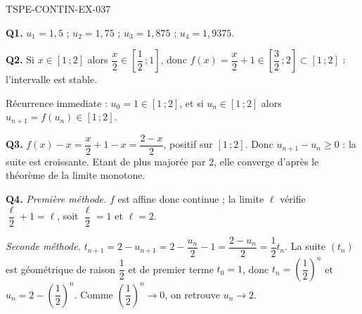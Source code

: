 \begin{corrige}{TSPE-CONTIN-EX-037}

\textbf{Q1.} $u_1 = 1{,}5$ ; $u_2 = 1{,}75$ ; $u_3 = 1{,}875$ ; $u_4 = 1{,}9375$.

\textbf{Q2.} Si $x \in [1\,;2]$ alors $\dfrac{x}{2} \in \left[\dfrac12\,;1\right]$, donc $f(x) = \dfrac{x}{2} + 1 \in \left[\dfrac32\,;2\right] \subset [1\,;2]$ : l'intervalle est stable.

Récurrence immediate : $u_0 = 1 \in [1\,;2]$, et si $u_n \in [1\,;2]$ alors $u_{n+1} = f(u_n) \in [1\,;2]$.

\textbf{Q3.} $f(x) - x = \dfrac{x}{2} + 1 - x = \dfrac{2-x}{2}$, positif sur $[1\,;2]$. Donc $u_{n+1} - u_n \geq 0$ : la suite est croissante. Etant de plus majorée par $2$, elle converge d'après le théorème de la limite monotone.

\textbf{Q4.} \emph{Première méthode.} $f$ est affine donc continue ; la limite $\ell$ vérifie $\dfrac{\ell}{2} + 1 = \ell$, soit $\dfrac{\ell}{2} = 1$ et $\ell = 2$.

\emph{Seconde méthode.} $t_{n+1} = 2 - u_{n+1} = 2 - \dfrac{u_n}{2} - 1 = \dfrac{2 - u_n}{2} = \dfrac{1}{2}t_n$. La suite $(t_n)$ est géométrique de raison $\dfrac12$ et de premier terme $t_0 = 1$, donc $t_n = \left(\dfrac12\right)^n$ et $u_n = 2 - \left(\dfrac12\right)^n$. Comme $\left(\dfrac12\right)^n \to 0$, on retrouve $u_n \to 2$.
\end{corrige}
